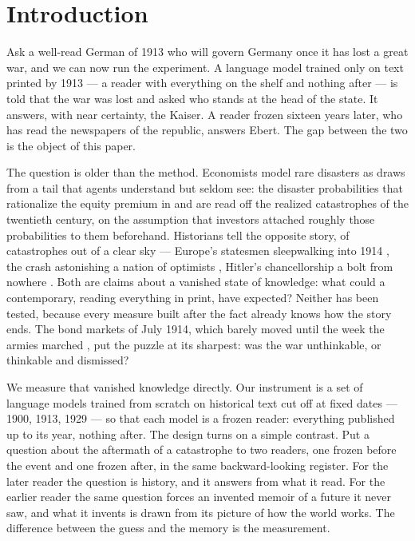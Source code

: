 \documentclass[11pt]{article}
\begin{document}
\section{Introduction}\label{sec:intro}

Ask a well-read German of 1913 who will govern Germany once it has lost a great war, and we can now run
the experiment. A language model trained only on text printed by 1913 --- a reader with everything on the
shelf and nothing after --- is told that the war was lost and asked who stands at the head of the state.
It answers, with near certainty, the Kaiser. A reader frozen sixteen years later, who has read the
newspapers of the republic, answers Ebert. The gap between the two is the object of this paper.

The question is older than the method. Economists model rare disasters as draws from a tail that agents
understand but seldom see: the disaster probabilities that rationalize the equity premium in
\citet{rietz1988} and \citet{barro2006} are read off the realized catastrophes of the twentieth century,
on the assumption that investors attached roughly those probabilities to them beforehand. Historians tell
the opposite story, of catastrophes out of a clear sky --- Europe's statesmen sleepwalking into 1914
\citep{clark2012}, the crash astonishing a nation of optimists \citep{galbraith1955,fisher1930}, Hitler's
chancellorship a bolt from nowhere \citep{turner1996}. Both are claims about a vanished state of knowledge:
what could a contemporary, reading everything in print, have expected? Neither has been tested, because
every measure built after the fact already knows how the story ends. The bond markets of July 1914, which
barely moved until the week the armies marched \citep{ferguson2006}, put the puzzle at its sharpest: was
the war unthinkable, or thinkable and dismissed?

We measure that vanished knowledge directly. Our instrument is a set of language models trained from
scratch on historical text cut off at fixed dates --- 1900, 1913, 1929 --- so that each model is a frozen
reader: everything published up to its year, nothing after. The design turns on a simple contrast. Put a
question about the aftermath of a catastrophe to two readers, one frozen before the event and one frozen
after, in the same backward-looking register. For the later reader the question is history, and it
answers from what it read. For the earlier reader the same question forces an invented memoir of a future
it never saw, and what it invents is drawn from its picture of how the world works. The difference
between the guess and the memory is the measurement.
\end{document}
